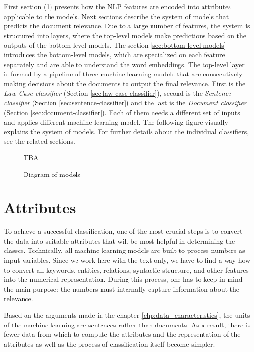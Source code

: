 \documentclass[
  digital, %
  notable,   %
  nolof,     %
  nolot,     %
]{fithesis3}
\begin{document}
First section (\ref{sec:attributes}) presents how the NLP features are encoded into attributes applicable to the models.
Next sections describe the system of models that predicts the document relevance.
Due to a large number of features, the system is structured into layers, where the top-level models make predictions based on the outputs of the bottom-level models.
The section \ref{sec:bottom-level-models} introduces the bottom-level models, which are specialized on each feature separately and are able to understand the word embeddings.
The top-level layer is formed by a pipeline of three machine learning models that are consecutively making decisions about the documents to output the final relevance.
First is the \textit{Law-Case classifier} (Section \ref{sec:law-case-classifier}), second is the \textit{Sentence classifier} (Section \ref{sec:sentence-classifier}) and the last is the \textit{Document classifier} (Section \ref{sec:document-classifier}).
Each of them needs a different set of inputs and applies different machine learning model.
The following figure visually explains the system of models.
For further details about the individual classifiers, see the related sections.


\begin{figure}[H]
\caption{Diagram of models}
\label{fig:models-diagram}
TBA
\end{figure}

\section{Attributes}
\label{sec:attributes}
To achieve a successful classification, one of the most crucial steps is to convert the data into suitable attributes that will be most helpful in determining the classes.
Technically, all machine learning models are built to process numbers as input variables.
Since we work here with the text only, we have to find a way how to convert all keywords, entities, relations, syntactic structure, and other features into the numerical representation.
During this process, one has to keep in mind the main purpose: the numbers must internally capture information about the relevance.

Based on the arguments made in the chapter \ref{chp:data_characteristics}, the units of the machine learning are sentences rather than documents.
As a result, there is fewer data from which to compute the attributes and the representation of the attributes as well as the process of classification itself become simpler.
\end{document}
